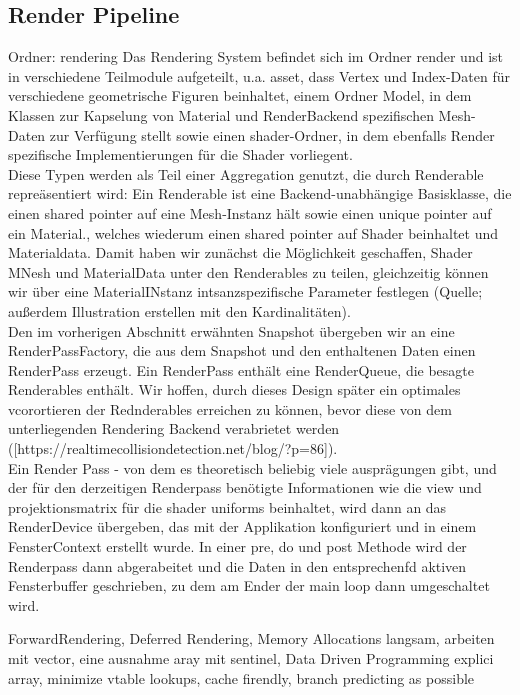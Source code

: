 \subsection{Render Pipeline}
Ordner: rendering
Das Rendering System befindet sich im Ordner render und ist in verschiedene Teilmodule aufgeteilt, u.a. asset, dass Vertex und Index-Daten für verschiedene geometrische Figuren beinhaltet, einem Ordner Model, in dem Klassen zur Kapselung von Material und RenderBackend spezifischen Mesh-Daten zur Verfügung stellt sowie einen shader-Ordner, in dem ebenfalls Render spezifische Implementierungen für die Shader vorliegent.\\
Diese Typen werden als Teil einer Aggregation genutzt, die durch Renderable repreäsentiert wird: Ein Renderable ist eine Backend-unabhängige Basisklasse, die einen shared pointer auf eine Mesh-Instanz hält sowie einen unique pointer auf ein Material., welches wiederum einen shared pointer auf Shader beinhaltet und Materialdata.
Damit haben wir zunächst die Möglichkeit geschaffen, Shader MNesh und MaterialData unter den Renderables zu teilen, gleichzeitig können wir über eine MaterialINstanz intsanzspezifische Parameter festlegen (Quelle; außerdem Illustration erstellen mit den Kardinalitäten).\\
Den im vorherigen Abschnitt erwähnten Snapshot übergeben wir an eine RenderPassFactory, die aus dem Snapshot und den enthaltenen Daten einen RenderPass erzeugt. Ein RenderPass enthält eine RenderQueue, die besagte Renderables enthält. Wir hoffen, durch dieses Design später ein optimales vcorortieren der Rednderables erreichen zu können, bevor diese von dem unterliegenden Rendering Backend verabrietet werden ([https://realtimecollisiondetection.net/blog/?p=86]).\\
Ein Render Pass - von dem es theoretisch beliebig viele ausprägungen gibt, und der für den derzeitigen Renderpass benötigte Informationen wie die view und projektionsmatrix für die shader uniforms beinhaltet, wird dann an das RenderDevice übergeben, das mit der Applikation konfiguriert und in einem FensterContext erstellt wurde. In einer pre, do und post Methode wird der Renderpass dann abgerabeitet und die Daten in den entsprechenfd aktiven Fensterbuffer geschrieben, zu dem am Ender der main loop dann umgeschaltet wird.

ForwardRendering, Deferred Rendering, Memory Allocations langsam, arbeiten mit vector, eine ausnahme aray mit sentinel, Data Driven Programming explici array, minimize vtable lookups, cache firendly, branch predicting as possible
